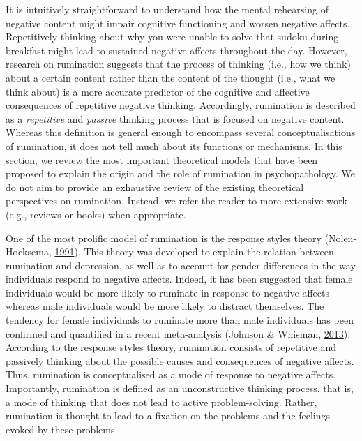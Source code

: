 \documentclass[a4paper,12pt,twoside,onecolumn,openright,final,oldfontcommands]{memoir}
\begin{document}
It is intuitively straightforward to understand how the mental rehearsing of negative content might impair cognitive functioning and worsen negative affects. Repetitively thinking about why you were unable to solve that sudoku during breakfast might lead to sustained negative affects throughout the day. However, research on rumination suggests that the process of thinking (i.e., how we think) about a certain content rather than the content of the thought (i.e., what we think about) is a more accurate predictor of the cognitive and affective consequences of repetitive negative thinking. Accordingly, rumination is described as a \emph{repetitive} and \emph{passive} thinking process that is focused on negative content. Whereas this definition is general enough to encompass several conceptualisations of rumination, it does not tell much about its functions or mechanisms. In this section, we review the most important theoretical models that have been proposed to explain the origin and the role of rumination in psychopathology. We do not aim to provide an exhaustive review of the existing theoretical perspectives on rumination. Instead, we refer the reader to more extensive work (e.g., reviews or books) when appropriate.

One of the most prolific model of rumination is the response styles theory (Nolen-Hoeksema, \protect\hyperlink{ref-nolen-hoeksema_responses_1991}{1991}). This theory was developed to explain the relation between rumination and depression, as well as to account for gender differences in the way individuals respond to negative affects. Indeed, it has been suggested that female individuals would be more likely to ruminate in response to negative affects whereas male individuals would be more likely to distract themselves. The tendency for female individuals to ruminate more than male individuals has been confirmed and quantified in a recent meta-analysis (Johnson \& Whisman, \protect\hyperlink{ref-Johnson2013}{2013}). According to the response styles theory, rumination consists of repetitive and passively thinking about the possible causes and consequences of negative affects. Thus, rumination is conceptualised as a mode of response to negative affects. Importantly, rumination is defined as an unconstructive thinking process, that is, a mode of thinking that does not lead to active problem-solving. Rather, rumination is thought to lead to a fixation on the problems and the feelings evoked by these problems.
\end{document}
